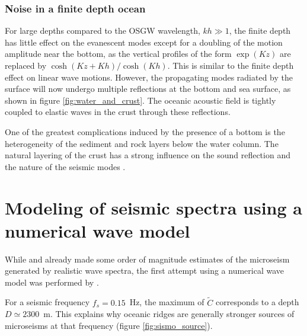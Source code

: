 \subsubsection{Noise in a finite depth ocean}
For large depths compared to the OSGW wavelength, $kh \gg 1$, the finite depth 
has little effect on the evanescent modes except
for a doubling of the motion amplitude near the bottom, as the vertical profiles of the form 
$\exp(K z)$ are replaced by $\cosh(K z+K h)/\cosh(K h)$. This is similar to the finite depth effect 
on  linear wave motions. 
However, the propagating modes  radiated by the surface will now undergo multiple reflections at the bottom and sea surface, 
as shown in figure \ref{fig:water_and_crust}. The oceanic acoustic field is tightly coupled 
to elastic waves in the crust through these reflections.

One of the greatest complications induced by the presence of a bottom is the heterogeneity of  
the sediment and rock layers below the water column. 
The natural layering of the crust has a strong influence on the sound reflection and 
the nature of the seismic modes \citep[e.g.][]{Latham&Sutton1966,Abramovici1968}. 






\section{Modeling of seismic spectra using a numerical wave model}
While \cite{Hasselmann1963c} and \cite{Szelwis1982} already made some order of magnitude estimates of the microseism generated by 
realistic wave spectra, the first attempt using a numerical wave model was performed by \cite{Kedar&al.2008}. 

For a seismic frequency  $f_s=0.15$~Hz, the maximum of $\widetilde{C}$ corresponds to a depth $D\simeq2300$~m. This explains 
why oceanic ridges are generally stronger sources of microseisms at that frequency (figure \ref{fig:sismo_source}).

